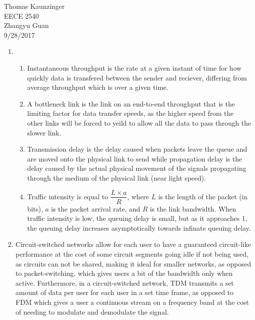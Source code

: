 \documentclass[12pt]{article}
\begin{document}
\noindent Thomas Kaunzinger\\
EECE 2540\\
Zhangyu Guan\\
9/28/2017\\
\begin{enumerate}
	\item \begin{enumerate}
			\item Instantaneous throughput is the rate at a given instant of time for how quickly data is transfered between the sender and reciever, differing from average throughput which is over a given time.
			\item A bottleneck link is the link on an end-to-end throughput that is the limiting factor for data transfer speeds, as the higher speed from the other links will be forced to yeild to allow all the data to pass through the slower link.
			\item Transmission delay is the delay caused when packets leave the queue and are moved onto the physical link to send while propagation delay is the delay caused by the actual physical movement of the signals propagating through the medium of the physical link (near light speed).
			\item Traffic intensity is equal to $\dfrac{L \times a}{R}$, where $L$ is the length of the packet (in bits), $a$ is the packet arrival rate, and $R$ is the link bandwidth. When traffic intensity is low, the queuing delay is small, but as it approaches 1, the queuing delay increases asymptotically towards infinate queuing delay.
		\end{enumerate}

	\item Circuit-switched networks allow for each user to have a guaranteed circuit-like performance at the cost of some circuit segments going idle if not being used, as circuits can not be shared, making it ideal for smaller networks, as opposed to packet-switching, which gives users a bit of the bandwidth only when active. Furthermore, in a circuit-switched network, TDM transmits a set amount of data per user for each user in a set time frame, as opposed to FDM which gives a user a continuous stream on a frequency band at the cost of needing to modulate and demodulate the signal.


\end{enumerate}
\end{document}
